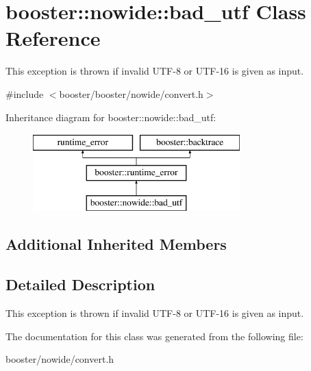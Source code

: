 \section{booster\-:\-:nowide\-:\-:bad\-\_\-utf Class Reference}
\label{classbooster_1_1nowide_1_1bad__utf}


This exception is thrown if invalid U\-T\-F-\/8 or U\-T\-F-\/16 is given as input.  




{\ttfamily \#include $<$booster/booster/nowide/convert.\-h$>$}

Inheritance diagram for booster\-:\-:nowide\-:\-:bad\-\_\-utf\-:\begin{figure}[H]
\begin{center}
\leavevmode
\includegraphics[height=3.000000cm]{classbooster_1_1nowide_1_1bad__utf}
\end{center}
\end{figure}
\subsection*{Additional Inherited Members}


\subsection{Detailed Description}
This exception is thrown if invalid U\-T\-F-\/8 or U\-T\-F-\/16 is given as input. 

The documentation for this class was generated from the following file\-:\begin{DoxyCompactItemize}
\item 
booster/nowide/convert.\-h\end{DoxyCompactItemize}
